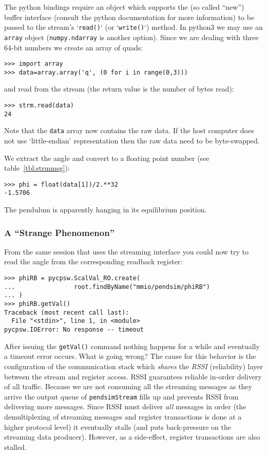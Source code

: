 \documentclass[10pt]{article}
\newcommand{\py}        {python}
\newcommand{\pyt}       {python3}
\newcommand{\cod}[1] {{\tt#1}}
\begin{document}
The \py{} bindings require an object which supports the (so called ``new'') buffer
interface (consult the \py{} documentation for more information) to be passed to
the stream's `\cod{read()}` (or `\cod{write()}`) method.
In \pyt{} we may use an \cod{array} object (\cod{numpy.ndarray} is another option).
Since we are dealing with three 64-bit numbers we create an array of quads:
\begin{verbatim}
>>> import array
>>> data=array.array('q', (0 for i in range(0,3)))
\end{verbatim}
and read from the stream (the return value is the number of bytes read):
\begin{verbatim}
>>> strm.read(data)
24
\end{verbatim}
Note that the \cod{data} array now contains the raw data. If the host computer does not
use `little-endian' representation then the raw data need to be byte-swapped.

We extract the angle and convert to a floating point number (see
table~\ref{tbl:strmmsg}):
\begin{verbatim}
>>> phi = float(data[1])/2.**32
-1.5706
\end{verbatim}
The pendulum is apparently hanging in its equilibrium position.

\subsubsection{A ``Strange Phenomenon''}
From the same session that uses the streaming interface you could now try to
read the angle from the corresponding readback register:
\begin{verbatim}
>>> phiRB = pycpsw.ScalVal_RO.create(
...                root.findByName("mmio/pendsim/phiRB")
... )
>>> phiRB.getVal()
Traceback (most recent call last):
  File "<stdin>", line 1, in <module>
pycpsw.IOError: No response -- timeout
\end{verbatim}
After issuing the \cod{getVal()} command nothing happens for a while and eventually
a timeout error occurs. What is going wrong? The cause for this behavior is the
configuration of the communication stack which {\em shares} the {\em RSSI} (reliability) layer
between the stream and register access. RSSI guarantees reliable in-order delivery
of all traffic. Because we are not consuming all the streaming messages as they arrive
the output queue of \cod{pendsimStream} fills up and prevents RSSI from delivering
more messages. Since RSSI must deliver {\em all} messages in order (the demultiplexing
of streaming messages and register transactions is done at a higher protocol level)
it eventually stalls (and puts back-pressure on the streaming data producer).
However, as a side-effect, register transactions are also stalled.
\end{document}
